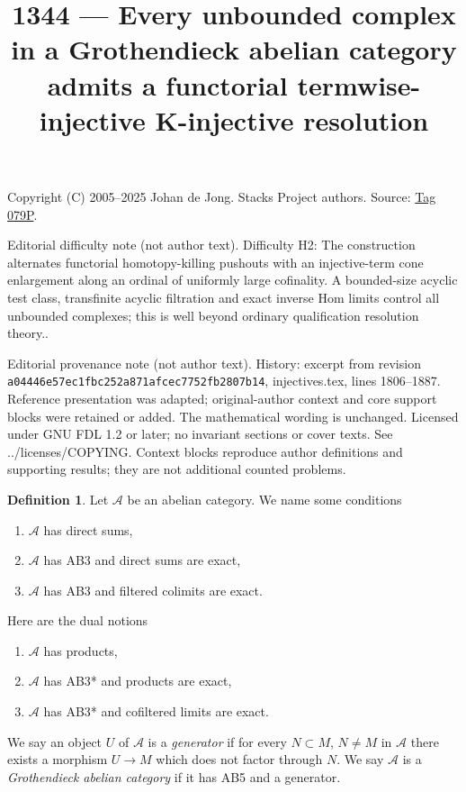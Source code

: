 \documentclass{amsart}
\theoremstyle{plain}
\theoremstyle{definition}
\newtheorem{definition}[subsection]{Definition}
\theoremstyle{remark}
\numberwithin{equation}{subsection}
\begin{document}
\title[Stacks Project, Tag 079P]{1344 --- Every unbounded complex in a Grothendieck abelian category admits a functorial termwise-injective K-injective resolution}
\maketitle
\noindent Copyright (C) 2005--2025 Johan de Jong. Stacks Project authors. Source: \href{https://stacks.math.columbia.edu/tag/079P}{Tag 079P}.

\noindent Editorial difficulty note (not author text). Difficulty H2: The construction alternates functorial homotopy-killing pushouts with an injective-term cone enlargement along an ordinal of uniformly large cofinality. A bounded-size acyclic test class, transfinite acyclic filtration and exact inverse Hom limits control all unbounded complexes; this is well beyond ordinary qualification resolution theory..

\noindent Editorial provenance note (not author text). History: excerpt from revision \texttt{a0444\allowbreak 6e57e\allowbreak c1fbc\allowbreak 252a8\allowbreak 71afc\allowbreak ec775\allowbreak 2fb28\allowbreak 07b14}, injectives.tex, lines 1806--1887. Reference presentation was adapted; original-author context and core support blocks were retained or added. The mathematical wording is unchanged. Licensed under GNU FDL 1.2 or later; no invariant sections or cover texts. See ../licenses/COPYING. Context blocks reproduce author definitions and supporting results; they are not additional counted problems.

\begin{definition}
\label{definition-grothendieck-conditions}
Let $\mathcal{A}$ be an abelian category. We name some conditions
\begin{enumerate}
\item[AB3] $\mathcal{A}$ has direct sums,
\item[AB4] $\mathcal{A}$ has AB3 and direct sums are exact,
\item[AB5] $\mathcal{A}$ has AB3 and filtered colimits are exact.
\end{enumerate}
Here are the dual notions
\begin{enumerate}
\item[AB3*] $\mathcal{A}$ has products,
\item[AB4*] $\mathcal{A}$ has AB3* and products are exact,
\item[AB5*] $\mathcal{A}$ has AB3* and cofiltered limits are exact.
\end{enumerate}
We say an object $U$ of $\mathcal{A}$ is a {\it generator} if
for every $N \subset M$, $N \not = M$ in $\mathcal{A}$ there exists a morphism
$U \to M$ which does not factor through $N$.
We say $\mathcal{A}$ is a {\it Grothendieck abelian category} if
it has AB5 and a generator.
\end{definition}
\end{document}

